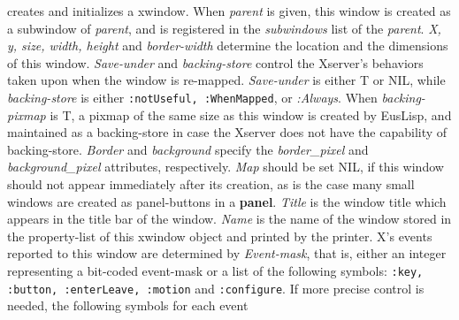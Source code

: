 \begin{refdesc}

{creates and initializes a xwindow.
When {\em parent} is given, this window is created as a subwindow
of {\em parent}, and is registered in the {\em subwindows} list of
the {\em parent}.
{\em X, y, size, width, height} and {\em border-width} determine
the location and the dimensions of this window.
{\em Save-under} and {\em backing-store} control the Xserver's behaviors
taken upon when the window is re-mapped. {\em Save-under} is either
T or NIL, while {\em backing-store} is either {\tt :notUseful, :WhenMapped},
or {\em :Always}.
When {\em backing-pixmap} is T, a pixmap of the same size as this window
is created by EusLisp, and maintained as a backing-store in case
the Xserver does not have the capability of backing-store.
{\em Border} and {\em background} specify the {\em border\_pixel}
and {\em background\_pixel} attributes, respectively.
{\em Map} should be set NIL, if this window should not appear
immediately after its creation, as is the case many small windows 
are created as panel-buttons in a {\bf panel}.
{\em Title} is the window title which appears in the title bar of 
the window.
{\em Name} is the name of the window stored in the property-list
of this xwindow object and printed by the printer.
X's events reported to this window are determined by 
{\em Event-mask}, that is, either an integer representing a bit-coded event-mask
or a list of the following symbols:
{\tt :key, :button, :enterLeave, :motion} and {\tt :configure}.
If more precise control is needed, the following symbols for each event
}
\end{refdesc}
